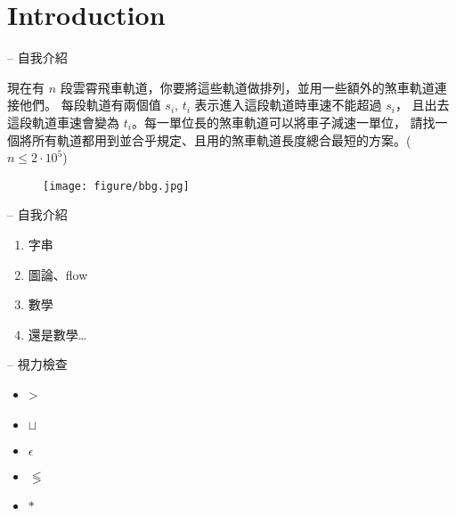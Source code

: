\documentclass[standalone]{beamer}
\begin{document}
\section{Introduction}

\begin{frame}{{\secname} -- 自我介紹}
\begin{problem}
  \small
  現在有 $n$ 段雲霄飛車軌道，你要將這些軌道做排列，並用一些額外的煞車軌道連接他們。
  每段軌道有兩個值 $s_i$, $t_i$ 表示進入這段軌道時車速不能超過 $s_i$，
  且出去這段軌道車速會變為 $t_i$。每一單位長的煞車軌道可以將車子減速一單位，
  請找一個將所有軌道都用到並合乎規定、且用的煞車軌道長度總合最短的方案。($n \leq 2 \cdot 10^5$)
\end{problem}
\pause

\begin{figure}
\texttt{[image: figure/bbg.jpg]}%
\end{figure}
\end{frame}

\begin{frame}{{\secname} -- 自我介紹}
  \begin{enumerate}
    \item 字串
    \item 圖論、flow
    \item 數學
    \item<2-> 還是數學…
  \end{enumerate}

\end{frame}

\begin{frame}{{\secname} -- 視力檢查}
  \begin{itemize}
    \item<+-> {\fontsize{60pt}{100pt}\selectfont >} \\[20pt]
    \item<+-> {\Huge $\sqcup$} \\[10pt]
    \item<+-> {\Large $\epsilon$} \\[10pt]
    \item<+-> {\Large $\lessgtr$} \\[10pt]
    \item<+-> {\Huge $\ast$}
  \end{itemize}
\end{frame}
\end{document}
